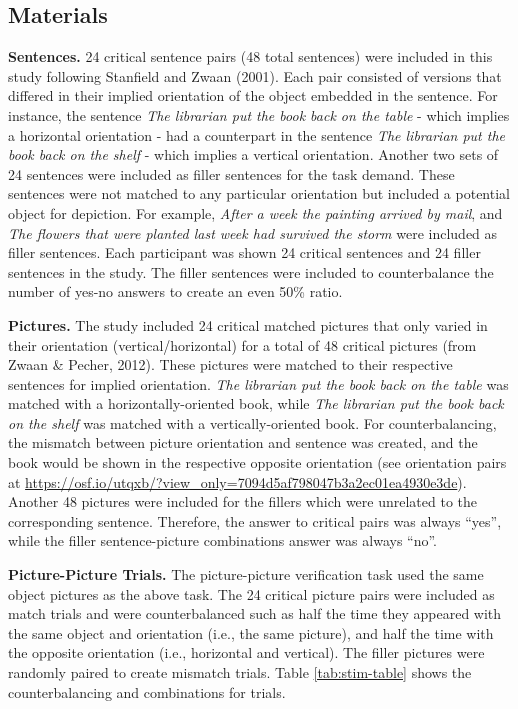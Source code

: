 \documentclass[
  man,floatsintext]{apa7}
\begin{document}
\hypertarget{materials}{%
\subsection{Materials}\label{materials}}

\textbf{Sentences.} 24 critical sentence pairs (48 total sentences) were
included in this study following Stanfield and Zwaan (2001). Each pair
consisted of versions that differed in their implied orientation of the
object embedded in the sentence. For instance, the sentence \emph{The
librarian put the book back on the table} - which implies a horizontal
orientation - had a counterpart in the sentence \emph{The librarian put the
book back on the shelf} - which implies a vertical orientation. Another
two sets of 24 sentences were included as filler sentences for the task
demand. These sentences were not matched to any particular orientation
but included a potential object for depiction. For example, \emph{After a
week the painting arrived by mail}, and \emph{The flowers that were planted
last week had survived the storm} were included as filler sentences.
Each participant was shown 24 critical sentences and 24 filler sentences
in the study. The filler sentences were included to counterbalance the
number of yes-no answers to create an even 50\% ratio.

\textbf{Pictures.} The study included 24 critical matched pictures that only
varied in their orientation (vertical/horizontal) for a total of 48
critical pictures (from Zwaan \& Pecher, 2012). These
pictures were matched to their respective sentences for implied
orientation. \emph{The librarian put the book back on the table} was matched
with a horizontally-oriented book, while \emph{The librarian put the book
back on the shelf} was matched with a vertically-oriented book. For
counterbalancing, the mismatch between picture orientation and sentence
was created, and the book would be shown in the respective opposite
orientation (see orientation pairs at \url{https://osf.io/utqxb/?view_only=7094d5af798047b3a2ec01ea4930e3de}). Another
48 pictures were included for the fillers which were unrelated to the
corresponding sentence. Therefore, the answer to critical pairs was
always ``yes'', while the filler sentence-picture combinations answer was
always ``no''.

\textbf{Picture-Picture Trials.} The picture-picture verification task used
the same object pictures as the above task. The 24 critical picture
pairs were included as match trials and were counterbalanced such as
half the time they appeared with the same object and orientation (i.e.,
the same picture), and half the time with the opposite orientation
(i.e., horizontal and vertical). The filler pictures were randomly
paired to create mismatch trials. Table \ref{tab:stim-table} shows the
counterbalancing and combinations for trials.
\end{document}
